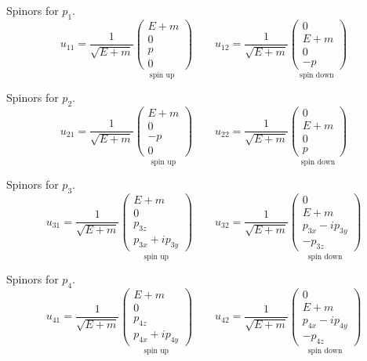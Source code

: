 Spinors for $p_1$.
\begin{equation*}
u_{11}=\frac{1}{\sqrt{E+m}}
\underset{\text{spin up }}
{\begin{pmatrix}E+m\\0\\p\\0\end{pmatrix}}
\qquad
u_{12}=\frac{1}{\sqrt{E+m}}
\underset{\text{spin down }}
{\begin{pmatrix}0\\E+m\\0\\-p\end{pmatrix}}
\end{equation*}

Spinors for $p_2$.
\begin{equation*}
u_{21}=\frac{1}{\sqrt{E+m}}
\underset{\text{spin up}}
{\begin{pmatrix}E+m\\0\\-p\\0\end{pmatrix}}
\qquad
u_{22}=\frac{1}{\sqrt{E+m}}
\underset{\text{spin down}}
{\begin{pmatrix}0\\E+m\\0\\p\end{pmatrix}}
\end{equation*}

Spinors for $p_3$.
\begin{equation*}
u_{31}=\frac{1}{\sqrt{E+m}}
\underset{\text{spin up}}
{\begin{pmatrix}E+m\\0\\p_{3z}\\p_{3x}+ip_{3y}\end{pmatrix}}
\qquad
u_{32}=\frac{1}{\sqrt{E+m}}
\underset{\text{spin down}}
{\begin{pmatrix}0\\E+m\\p_{3x}-ip_{3y}\\-p_{3z}\end{pmatrix}}
\end{equation*}

Spinors for $p_4$.
\begin{equation*}
u_{41}=\frac{1}{\sqrt{E+m}}
\underset{\text{spin up}}
{\begin{pmatrix}E+m\\0\\p_{4z}\\p_{4x}+ip_{4y}\end{pmatrix}}
\qquad
u_{42}=\frac{1}{\sqrt{E+m}}
\underset{\text{spin down}}
{\begin{pmatrix}0\\E+m\\p_{4x}-ip_{4y}\\-p_{4z}\end{pmatrix}}
\end{equation*}

